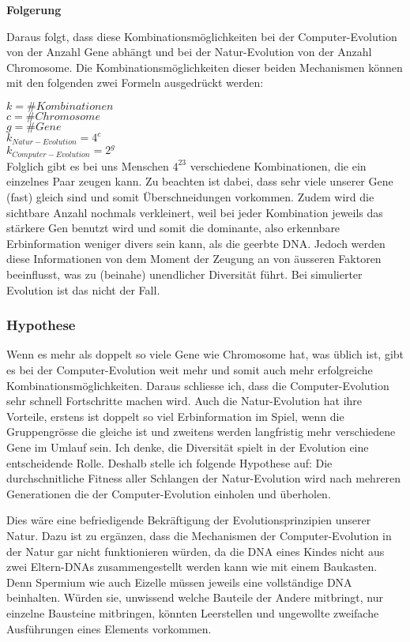 \documentclass[10pt,a4paper,ngerman,english]{article}
\begin{document}
\bigskip
\bigskip

\textbf{Folgerung}

\bigskip
Daraus folgt, dass diese Kombinationsmöglichkeiten bei der Computer-Evolution von der Anzahl Gene abhängt und bei der Natur-Evolution von der Anzahl Chromosome. Die Kombinationsmöglichkeiten dieser beiden Mechanismen können mit den folgenden zwei Formeln ausgedrückt werden:
\bigskip

$k=\#Kombinationen$\\
$c=\#Chromosome$\\
$g=\#Gene$\\

\large
$k_{Natur-Evolution}=4^c$\\

$k_{Computer-Evolution}=2^g$\\

\normalsize
Folglich gibt es bei uns Menschen $4^{23}$ verschiedene Kombinationen, die ein einzelnes Paar zeugen kann. Zu beachten ist dabei, dass sehr viele unserer Gene (fast) gleich sind und somit Überschneidungen vorkommen. Zudem wird die sichtbare Anzahl nochmals verkleinert, weil bei jeder Kombination jeweils das stärkere Gen benutzt wird und somit die dominante, also erkennbare Erbinformation weniger divers sein kann, als die geerbte DNA. Jedoch werden diese Informationen von dem Moment der Zeugung an von äusseren Faktoren beeinflusst, was zu (beinahe) unendlicher Diversität führt. Bei simulierter Evolution ist das nicht der Fall.

\subsubsection{Hypothese}

Wenn es mehr als doppelt so viele Gene wie Chromosome hat, was üblich ist, gibt es bei der Computer-Evolution weit mehr und somit auch mehr erfolgreiche Kombinationsmöglichkeiten. Daraus schliesse ich, dass die Computer-Evolution sehr schnell Fortschritte machen wird. Auch die Natur-Evolution hat ihre Vorteile, erstens ist doppelt so viel Erbinformation im Spiel, wenn die Gruppengrösse die gleiche ist und zweitens werden langfristig mehr verschiedene Gene im Umlauf sein. Ich denke, die Diversität spielt in der Evolution eine entscheidende Rolle. Deshalb stelle ich folgende Hypothese auf: Die durchschnitliche Fitness aller Schlangen der Natur-Evolution wird nach mehreren Generationen die der Computer-Evolution einholen und überholen. 

Dies wäre eine befriedigende Bekräftigung der Evolutionsprinzipien unserer Natur. Dazu ist zu ergänzen, dass die Mechanismen der Computer-Evolution in der Natur gar nicht funktionieren würden, da die DNA eines Kindes nicht aus zwei Eltern-DNAs zusammengestellt werden kann wie mit einem Baukasten. Denn Spermium wie auch Eizelle müssen jeweils eine vollständige DNA beinhalten. Würden sie, unwissend welche Bauteile der Andere mitbringt, nur einzelne Bausteine mitbringen, könnten Leerstellen und ungewollte zweifache Ausführungen eines Elements vorkommen.
\end{document}
